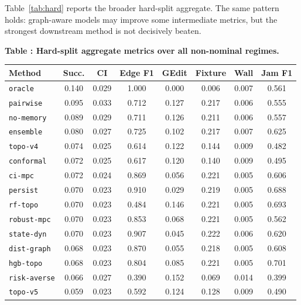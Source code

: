 \documentclass{article}
\begin{document}
Table~\ref{tab:hard} reports the broader hard-split aggregate. The same pattern holds: graph-aware models may improve some intermediate metrics, but the strongest downstream method is not decisively beaten.

\scriptsize
\begin{center}
\label{tab:hard}\textbf{Table \thetable: Hard-split aggregate metrics over all non-nominal regimes.}\\[0.4ex]
\begin{tabular}{lccccccc}
\toprule
Method & Succ. & CI & Edge F1 & GEdit & Fixture & Wall & Jam F1 \\
\midrule
\texttt{oracle} & 0.140 & 0.029 & 1.000 & 0.000 & 0.006 & 0.007 & 0.561 \\
\texttt{pairwise} & 0.095 & 0.033 & 0.712 & 0.127 & 0.217 & 0.006 & 0.555 \\
\texttt{no-memory} & 0.089 & 0.029 & 0.711 & 0.126 & 0.211 & 0.006 & 0.557 \\
\texttt{ensemble} & 0.080 & 0.027 & 0.725 & 0.102 & 0.217 & 0.007 & 0.625 \\
\texttt{topo-v4} & 0.074 & 0.025 & 0.614 & 0.122 & 0.144 & 0.009 & 0.482 \\
\texttt{conformal} & 0.072 & 0.025 & 0.617 & 0.120 & 0.140 & 0.009 & 0.495 \\
\texttt{ci-mpc} & 0.072 & 0.024 & 0.869 & 0.056 & 0.221 & 0.005 & 0.606 \\
\texttt{persist} & 0.070 & 0.023 & 0.910 & 0.029 & 0.219 & 0.005 & 0.688 \\
\texttt{rf-topo} & 0.070 & 0.023 & 0.484 & 0.146 & 0.221 & 0.005 & 0.693 \\
\texttt{robust-mpc} & 0.070 & 0.023 & 0.853 & 0.068 & 0.221 & 0.005 & 0.562 \\
\texttt{state-dyn} & 0.070 & 0.023 & 0.907 & 0.045 & 0.222 & 0.006 & 0.620 \\
\texttt{dist-graph} & 0.068 & 0.023 & 0.870 & 0.055 & 0.218 & 0.005 & 0.608 \\
\texttt{hgb-topo} & 0.068 & 0.023 & 0.804 & 0.085 & 0.221 & 0.005 & 0.701 \\
\texttt{risk-averse} & 0.066 & 0.027 & 0.390 & 0.152 & 0.069 & 0.014 & 0.399 \\
\texttt{topo-v5} & 0.059 & 0.023 & 0.592 & 0.124 & 0.128 & 0.009 & 0.490 \\
\bottomrule
\end{tabular}
\end{center}
\normalsize
\end{document}
